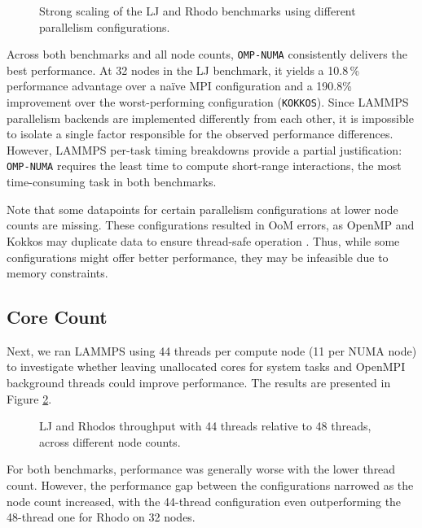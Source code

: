 \documentclass[sigplan, nonacm, screen]{acmart}
\begin{document}
\begin{figure}[h]
    
    \caption{
        Strong scaling of the LJ and Rhodo benchmarks using different parallelism configurations.
    }
    \label{parallelism-plot}
\end{figure}

Across both benchmarks and all node counts, \texttt{OMP-NUMA} consistently delivers the best
performance. At 32 nodes in the LJ benchmark, it yields a 10.8\,\% performance advantage over a
naïve MPI configuration and a 190.8\% improvement over the worst-performing configuration
(\texttt{KOKKOS}). Since LAMMPS parallelism backends are implemented differently from each other,
it is impossible to isolate a single factor responsible for the observed performance differences.
However, LAMMPS per-task timing breakdowns provide a partial justification: \texttt{OMP-NUMA}
requires the least time to compute short-range interactions, the most time-consuming task in both
benchmarks.

Note that some datapoints for certain parallelism configurations at lower node counts are missing.
These configurations resulted in OoM errors, as OpenMP and Kokkos may duplicate data to ensure
thread-safe operation \cite{lammps-slides}. Thus, while some configurations might offer better
performance, they may be infeasible due to memory constraints.

\subsection{Core Count} %
\label{tuning-core-count}

Next, we ran LAMMPS using 44 threads per compute node (11 per NUMA node) to investigate whether
leaving unallocated cores for system tasks and OpenMPI background threads could improve performance.
The results are presented in Figure \ref{cores-plot}.

\begin{figure}[h]
    
    \caption{
        LJ and Rhodos throughput with 44 threads relative to 48 threads, across different node
        counts.
    }
    \label{cores-plot}
    \vspace{-2\baselineskip}
\end{figure}

For both benchmarks, performance was generally worse with the lower thread count. However, the
performance gap between the configurations narrowed as the node count increased, with the 44-thread
configuration even outperforming the 48-thread one for Rhodo on 32 nodes.
\end{document}
